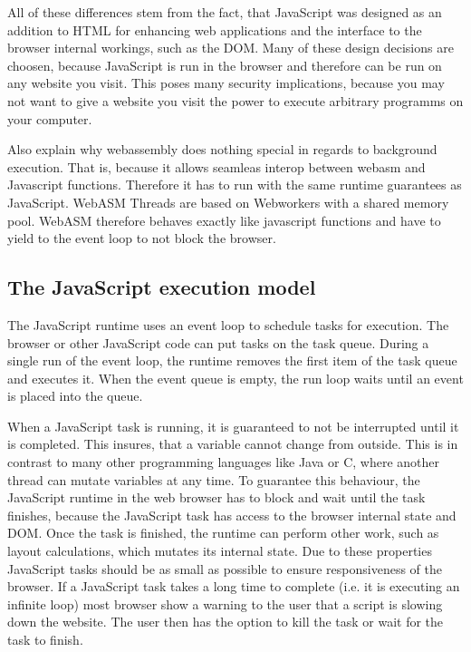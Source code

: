 \documentclass[article,type=bsc,colorback,accentcolor=tud9c]{tudthesis}
\begin{document}
  All of these differences stem from the fact, that JavaScript was designed as an addition to HTML for enhancing web applications and the interface to the browser internal workings, such as the DOM. Many of these design decisions are choosen, because JavaScript is run in the browser and therefore can be run on any website you visit. This poses many security implications, because you may not want to give a website you visit the power to execute arbitrary programms on your computer.

  Also explain why webassembly does nothing special in regards to background execution. That is, because it allows seamleas interop between webasm and Javascript functions. Therefore it has to run with the same runtime guarantees as JavaScript. WebASM Threads are based on Webworkers with a shared memory pool.
  WebASM therefore behaves exactly like javascript functions and have to yield to the event loop to not block the browser.

  
  \subsection{The JavaScript execution model}
  
  
  The JavaScript runtime uses an event loop to schedule tasks for execution\autocite{mdn-event-loop}. The browser or other JavaScript code can put tasks on the task queue. During a single run of the event loop, the runtime removes the first item of the task queue and executes it. When the event queue is empty, the run loop waits until an event is placed into the queue.

  When a JavaScript task is running, it is guaranteed to not be interrupted until it is completed. This insures, that a variable cannot change from outside. This is in contrast to many other programming languages like Java or C, where another thread can mutate variables at any time. To guarantee this behaviour, the JavaScript runtime in the web browser has to block and wait until the task finishes, because the JavaScript task has access to the browser internal state and DOM. Once the task is finished, the runtime can perform other work, such as layout calculations, which mutates its internal state. Due to these properties JavaScript tasks should be as small as possible to ensure responsiveness of the browser. If a JavaScript task takes a long time to complete (i.e. it is executing an infinite loop) most browser show a warning to the user that a script is slowing down the website. The user then has the option to kill the task or wait for the task to finish.
  
\end{document}

